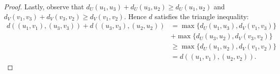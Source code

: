 \begin{proof}
        Lastly, observe that $d_U(u_1, u_3) + d_U(u_3, u_2) \ge d_U(u_1, u_2)$ and 
        $d_V(v_1, v_3) + d_V(v_3, v_2) \ge d_V(v_1, v_2)$. Hence $d$ satisfies the triangle inequality:
        \begin{align*}
            d((u_1, v_1), (u_3, v_3)) + d((u_3, v_3), (u_2, u_2)) &= \max{\{d_U(u_1, u_3), d_V(v_1, v_3)\}} \\
                                                                  &+ \max{\{d_U(u_3, u_2), d_V(v_3, v_2)\}} \\
                                                                  &\ge \max {\{d_U(u_1, u_2), d_V(v_1, v_2)\}} \\
                                                                  &= d((u_1, v_1), (u_2, v_2)).
        \end{align*}
    \end{proof}